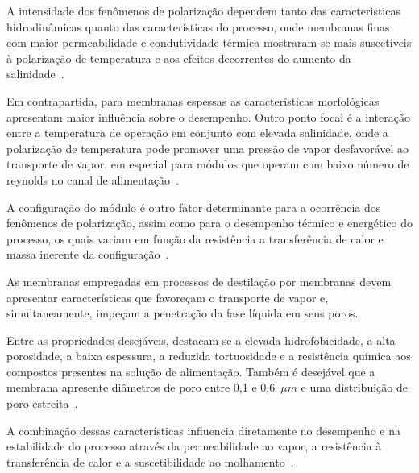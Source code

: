 A intensidade dos fenômenos de polarização dependem tanto das caracteristicas hidrodinâmicas quanto das características do processo, onde membranas finas com maior permeabilidade e condutividade térmica mostraram-se mais suscetíveis à polarização de temperatura e aos efeitos decorrentes do aumento da salinidade~\cite{Eykens2016,Chen2020}.

Em contrapartida, para membranas espessas as características morfológicas apresentam maior influência sobre o desempenho. Outro ponto focal é a interação entre a temperatura de operação em conjunto com elevada salinidade, onde a polarização de temperatura pode promover uma pressão de vapor desfavorável ao transporte de vapor, em especial para módulos que operam com baixo número de reynolds no canal de alimentação~\cite{Eykens2016,Chen2020}. 

A configuração do módulo é outro fator determinante para a ocorrência dos fenômenos de polarização, assim como para o desempenho térmico e energético do processo, os quais variam em função da resistência a transferência de calor e massa inerente da configuração~\cite{Gonzalez2017,Swaminathan2018}.



As membranas empregadas em processos de destilação por membranas devem apresentar características que favoreçam o transporte de vapor e, simultaneamente, impeçam a penetração da fase líquida em seus poros. 

Entre as propriedades desejáveis, destacam-se a elevada hidrofobicidade, a alta porosidade, a baixa espessura, a reduzida tortuosidade e a resistência química aos compostos presentes na solução de alimentação. Também é desejável que a membrana apresente diâmetros de poro entre 0,1 e 0,6~$\mu m$ e uma distribuição de poro estreita~\cite{Yeszhanov2021,mulder1996,habert_psm,Parani2021}.

A combinação dessas características influencia diretamente no desempenho e na estabilidade do processo através da permeabilidade ao vapor, a resistência à transferência de calor e a suscetibilidade ao molhamento~\cite{mulder1996,habert_psm,Parani2021}.

